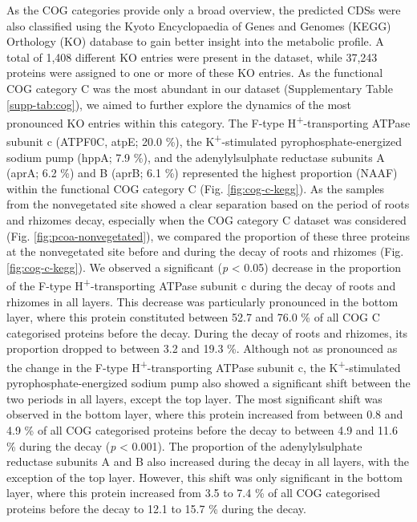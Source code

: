 \documentclass[
  12 pt,
]{article}
\begin{document}
As the COG categories provide only a broad overview, the predicted CDSs were also classified using the Kyoto Encyclopaedia of Genes and Genomes (KEGG) Orthology (KO) database to gain better insight into the metabolic profile. A total of 1,408 different KO entries were present in the dataset, while 37,243 proteins were assigned to one or more of these KO entries. As the functional COG category C was the most abundant in our dataset (Supplementary Table \ref{supp-tab:cog}), we aimed to further explore the dynamics of the most pronounced KO entries within this category. The F-type H\textsuperscript{+}-transporting ATPase subunit c (ATPF0C, atpE; 20.0 \si{\percent}), the K\textsuperscript{+}-stimulated pyrophosphate-energized sodium pump (hppA; 7.9 \si{\percent}), and the adenylylsulphate reductase subunits A (aprA; 6.2 \si{\percent}) and B (aprB; 6.1 \si{\percent}) represented the highest proportion (NAAF) within the functional COG category C (Fig. \ref{fig:cog-c-kegg}). As the samples from the nonvegetated site showed a clear separation based on the period of roots and rhizomes decay, especially when the COG category C dataset was considered (Fig. \ref{fig:pcoa-nonvegetated}), we compared the proportion of these three proteins at the nonvegetated site before and during the decay of roots and rhizomes (Fig. \ref{fig:cog-c-kegg}). We observed a significant (\emph{p} \textless{} 0.05) decrease in the proportion of the F-type H\textsuperscript{+}-transporting ATPase subunit c during the decay of roots and rhizomes in all layers. This decrease was particularly pronounced in the bottom layer, where this protein constituted between 52.7 and 76.0 \si{\percent} of all COG C categorised proteins before the decay. During the decay of roots and rhizomes, its proportion dropped to between 3.2 and 19.3 \si{\percent}. Although not as pronounced as the change in the F-type H\textsuperscript{+}-transporting ATPase subunit c, the K\textsuperscript{+}-stimulated pyrophosphate-energized sodium pump also showed a significant shift between the two periods in all layers, except the top layer. The most significant shift was observed in the bottom layer, where this protein increased from between 0.8 and 4.9 \si{\percent} of all COG categorised proteins before the decay to between 4.9 and 11.6 \si{\percent} during the decay (\emph{p} \textless{} 0.001). The proportion of the adenylylsulphate reductase subunits A and B also increased during the decay in all layers, with the exception of the top layer. However, this shift was only significant in the bottom layer, where this protein increased from 3.5 to 7.4 \si{\percent} of all COG categorised proteins before the decay to 12.1 to 15.7 \si{\percent} during the decay.
\end{document}
